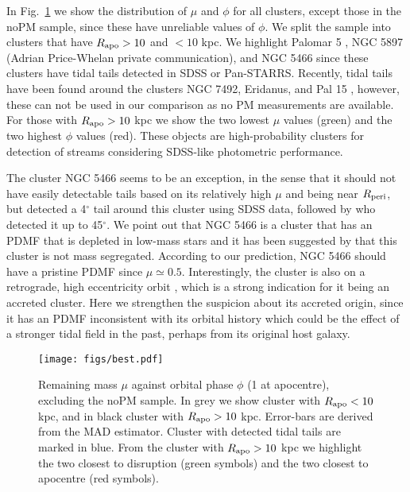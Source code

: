 \documentclass[useAMS,usenatbib,fleqn]{mnras}
\newcommand{\rapo}{R_{\rm apo}}
\newcommand{\rperi}{R_{\rm peri}}
\def\deg{^{\circ}}
\newcommand{\comm}[1]{#1}
\begin{document}
In Fig.~\ref{fig:best} we show the distribution of $\mu$ and $\phi$ for all
clusters, except those in the noPM sample, since these have unreliable values of
$\phi$. We split the sample into clusters that have $\rapo>10$ and $<10$ kpc. We
highlight Palomar 5 \citep{Odenkirchen01}, NGC 5897 (Adrian Price-Whelan private
communication), and NGC 5466 \citep{Belokurov06, Grillmair06b} since these
clusters have tidal tails detected in SDSS or Pan-STARRS. \comm{Recently, tidal
tails have been found around the clusters NGC 7492, Eridanus, and Pal
15 \citep{2017ApJ...841L..23N, 2017ApJ...840L..25M}, however, these can not be
used in our comparison as no PM measurements are available.} For those with
$\rapo> 10$ kpc we show the two lowest $\mu$ values (green) and the two highest
$\phi$ values (red). These objects are high-probability clusters for detection
of streams considering SDSS-like photometric performance. 

The cluster NGC 5466 seems to be an exception, in the sense that it should not
have easily detectable tails based on its relatively high $\mu$ and being near
$\rperi$, but \citet{Belokurov06} detected a 4$^{\circ}$ tail around this
cluster using SDSS data, followed by \citet{Grillmair06b} who detected it up to
45$\deg$. We point out that NGC 5466 is a cluster that has an PDMF that is
depleted in low-mass stars \citep{Sollima17} and \comm{it has been suggested by
\citet{Webb17} that this cluster is not mass segregated. According to our
prediction, NGC 5466 should have a pristine PDMF since $\mu\simeq0.5$.
Interestingly, the cluster is also on a retrograde, high eccentricity orbit
\citep{Forbes10}}, which is a strong indication for it being an accreted cluster.
Here we strengthen the suspicion about its accreted origin, since it has an PDMF
inconsistent with its orbital history which could be the effect of a stronger
tidal field in the past, perhaps from its original host galaxy.

\begin{figure}
\centering
\texttt{[image: figs/best.pdf]}
\caption{Remaining mass $\mu$ against orbital phase $\phi$ (1 at apocentre),
    excluding the noPM sample. In grey we show cluster with $\rapo<10$ kpc, and
    in black cluster with $\rapo > 10$ kpc. Error-bars are derived from the MAD
    estimator. Cluster with detected tidal tails are marked in blue. From the
cluster with $\rapo > 10$ kpc we highlight the two closest to disruption (green
symbols) and the two closest to apocentre (red symbols).}
\label{fig:best}
\end{figure}
\end{document}
